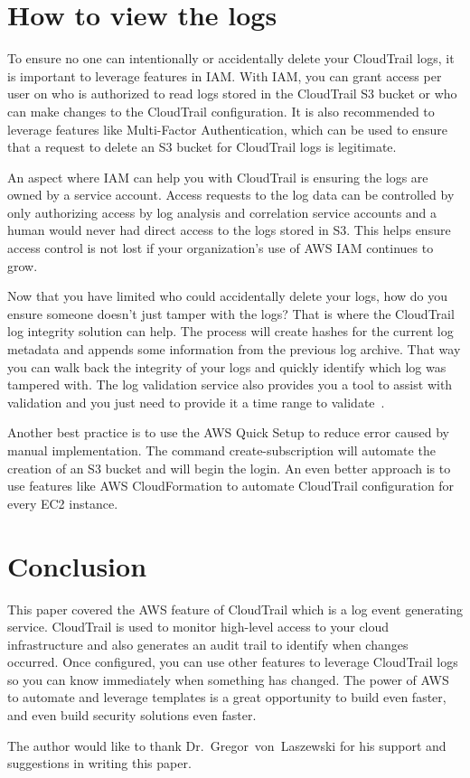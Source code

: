\section{How to view the logs}

To ensure no one can intentionally or accidentally delete your CloudTrail logs,
 it is important to leverage features in IAM. With IAM, you can grant access 
per user on who is authorized to read logs stored in the CloudTrail S3 bucket 
or who can make changes to the CloudTrail configuration. It is also recommended 
to leverage features like Multi-Factor Authentication, which can be used to 
ensure that a request to delete an S3 bucket for CloudTrail logs is legitimate.
 
An aspect where IAM can help you with CloudTrail is ensuring the logs are owned 
by a service account. Access requests to the log data can be controlled by only 
authorizing access by log analysis and correlation service accounts and a human
 would never had direct access to the logs stored in S3. This helps ensure 
access control is not lost if your organization’s use of AWS IAM continues to 
grow. 

Now that you have limited who could accidentally delete your logs, how do you 
ensure someone doesn’t just tamper with the logs? That is where the CloudTrail 
log integrity solution can help. The process will create hashes for the current 
log metadata and appends some information from the previous log archive. That 
way you can walk back the integrity of your logs and quickly identify which log 
was tampered with. The log validation service also provides you a tool to
 assist with validation and you just need to provide it a time range to 
validate~\cite{hid-sp18-518-CloudTrail-log-sharing}.

Another best practice is to use the AWS Quick Setup to reduce error caused by 
manual implementation. The command create-subscription will automate the 
creation of an S3 bucket and will begin the login. An even better approach is 
to use features like AWS CloudFormation to automate CloudTrail configuration 
for every EC2 instance.

\section{Conclusion}

This paper covered the AWS feature of CloudTrail which is a log event 
generating service. CloudTrail is used to monitor high-level access to your 
cloud infrastructure and also generates an audit trail to identify when changes 
occurred. Once configured, you can use other features to leverage CloudTrail 
logs so you can know immediately when something has changed. The power of AWS 
to automate and leverage templates is a great opportunity to build even faster, 
and even build security solutions even faster.

\begin{acks}

The author would like to thank Dr.~Gregor~von~Laszewski for his support and 
suggestions in writing this paper.

\end{acks}


 

